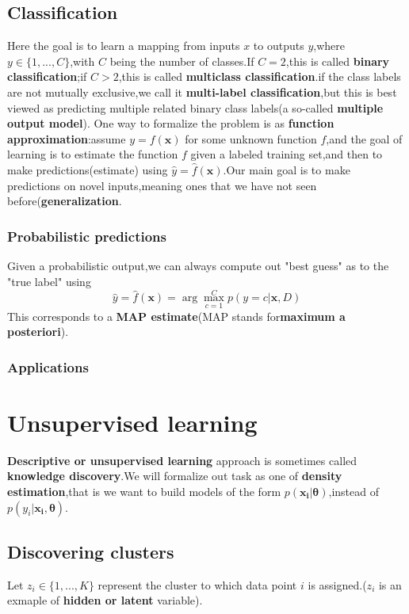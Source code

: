 \subsection{Classification}
  Here the goal is to learn a mapping from inputs $x$ to outputs $y$,where $y \in \{1,...,C\}$,with $C$ being the number of classes.If $C=2$,this is called \textbf{binary classification};if $C>2$,this is called \textbf{multiclass classification}.if the class labels are not mutually exclusive,we call it \textbf{multi-label classification},but this is best viewed as predicting multiple related binary class labels(a so-called \textbf{multiple output model}).
  One way to formalize the problem is as \textbf{function approximation}:assume $y=f(\mathbf{x})$ for some unknown function $f$,and the goal of learning is to estimate the function $f$ given a labeled training set,and then to make predictions(estimate) using $\hat{y} =\hat{f}(\mathbf{x})$.Our main goal is to make predictions on novel inputs,meaning ones that we have not seen before(\textbf{generalization}.
\subsubsection{Probabilistic predictions}
Given a probabilistic output,we can always compute out "best guess" as to the "true label" using
\begin{equation}
\hat{y} = \hat{f}(\mathbf{x}) = \arg\max\limits_{c=1}^{C} p(y=c|\mathbf{x},D)
\end{equation}
This corresponds to a \textbf{MAP estimate}(MAP stands for\textbf{maximum a posteriori}).
\subsubsection{Applications}

\section{Unsupervised learning}
  \textbf{Descriptive or unsupervised learning} approach is sometimes called \textbf{knowledge discovery}.We will formalize out task as one of \textbf{density estimation},that is we want to build models of the form $p(\mathbf{x_i|\theta})$,instead of $p(y_i|\mathbf{x_i,\theta})$.
\subsection{Discovering clusters}
Let $z_i \in \{1,...,K\}$ represent the cluster to which data point $i$ is assigned.($z_i$ is an exmaple of \textbf{hidden or latent} variable).
